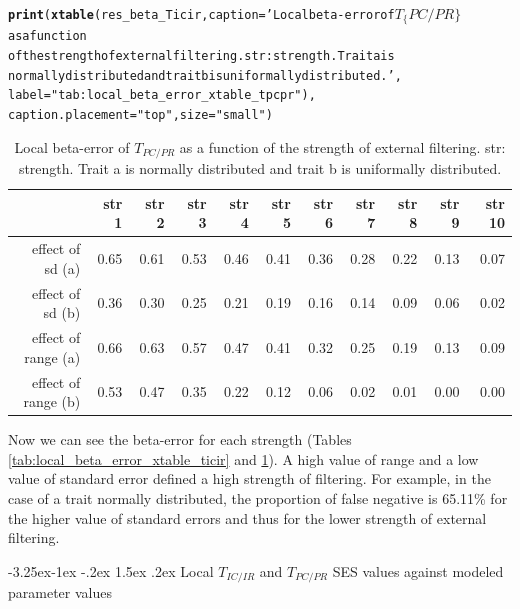 \documentclass[12pt]{article}\usepackage[]{graphicx}\usepackage[]{color}
\makeatletter
\newcommand{\hlstr}[1]{\textcolor[rgb]{0.192,0.494,0.8}{#1}}%
\newcommand{\hlstd}[1]{\textcolor[rgb]{0.345,0.345,0.345}{#1}}%
\newcommand{\hlkwc}[1]{\textcolor[rgb]{0.333,0.667,0.333}{#1}}%
\newcommand{\hlkwd}[1]{\textcolor[rgb]{0.737,0.353,0.396}{\textbf{#1}}}%
\newenvironment{kframe}{%
 \def\at@end@of@kframe{}%
 \ifinner\ifhmode%
  \def\at@end@of@kframe{\end{minipage}}%
  \begin{minipage}{\columnwidth}%
 \fi\fi%
 \def\FrameCommand##1{\hskip\@totalleftmargin \hskip-\fboxsep
 \colorbox{shadecolor}{##1}\hskip-\fboxsep
     \hskip-\linewidth \hskip-\@totalleftmargin \hskip\columnwidth}%
 \MakeFramed {\advance\hsize-\width
   \@totalleftmargin\z@ \linewidth\hsize
   \@setminipage}}%
 {\par\unskip\endMakeFramed%
 \at@end@of@kframe}
\newcounter {subsubsubsection}[subsubsection]
\newcommand\subsubsubsection{\@startsection{subsubsubsection}{4}{\z@}%
          {-3.25ex\@plus -1ex \@minus -.2ex}%
          {1.5ex \@plus .2ex}%
          {\normalfont\normalsize\bfseries}}
\makeatother
\begin{document}
\begin{kframe}
\begin{alltt}
\hlkwd{print}\hlstd{(}\hlkwd{xtable}\hlstd{(res_beta_Ticir,} \hlkwc{caption} \hlstd{=} \hlstr{'Local beta-error of $T_\{PC/PR\}$ as a function 
             of the strength of external filtering. str: strength. Trait a is 
             normally distributed and trait b is uniformally distributed.'}\hlstd{,}
             \hlkwc{label} \hlstd{=} \hlstr{"tab:local_beta_error_xtable_tpcpr"}\hlstd{),}
      \hlkwc{caption.placement} \hlstd{=} \hlstr{"top"}\hlstd{,} \hlkwc{size} \hlstd{=} \hlstr{"small"}\hlstd{)}
\end{alltt}
\end{kframe}%
\begin{table}[ht]
\centering
\caption{Local beta-error of $T_{PC/PR}$ as a function 
             of the strength of external filtering. str: strength. Trait a is 
             normally distributed and trait b is uniformally distributed.} 
\label{tab:local_beta_error_xtable_tpcpr}
{\small
\begin{tabular}{rrrrrrrrrrr}
  \hline
 & str 1 & str 2 & str 3 & str 4 & str 5 & str 6 & str 7 & str 8 & str 9 & str 10 \\ 
  \hline
effect of sd (a) & 0.65 & 0.61 & 0.53 & 0.46 & 0.41 & 0.36 & 0.28 & 0.22 & 0.13 & 0.07 \\ 
  effect of sd (b) & 0.36 & 0.30 & 0.25 & 0.21 & 0.19 & 0.16 & 0.14 & 0.09 & 0.06 & 0.02 \\ 
  effect of range (a) & 0.66 & 0.63 & 0.57 & 0.47 & 0.41 & 0.32 & 0.25 & 0.19 & 0.13 & 0.09 \\ 
  effect of range (b) & 0.53 & 0.47 & 0.35 & 0.22 & 0.12 & 0.06 & 0.02 & 0.01 & 0.00 & 0.00 \\ 
   \hline
\end{tabular}
}
\end{table}

 
Now we can see the beta-error for each strength (Tables \ref{tab:local_beta_error_xtable_ticir} and \ref{tab:local_beta_error_xtable_tpcpr}). A high value of range and a low value of standard error defined a high strength of filtering. For example, in the case of a trait normally distributed, the proportion of false negative is 65.11\% for the higher value of standard errors and thus for the lower strength of external filtering.
 
 
  \subsubsubsection {Local $T_{IC/IR}$ and $T_{PC/PR}$ SES values against modeled parameter values}
  
\end{document}
